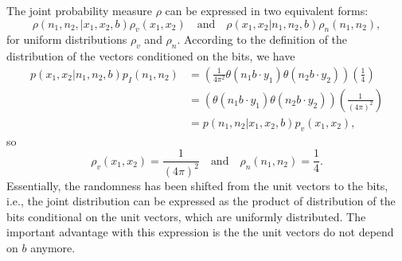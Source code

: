\documentclass[12pt,draft]{article}
\DeclareMathOperator{\R}{\mathbf{R}}
\theoremstyle{definition}
\theoremstyle{plain}
\begin{document}
    {
        \color{red}
        The joint probability measure $\rho$ can be
        expressed in two equivalent forms:
        \begin{equation}
            \rho(n_1,n_2,|x_1,x_2,b)\rho_v(x_1,x_2)
            \quad\text{and}\quad
            \rho(x_1,x_2|n_1,n_2,b)\rho_n(n_1,n_2),
        \end{equation}
        for uniform distributions $\rho_v$ and $\rho_n$.
        According to the definition of the distribution of
        the vectors conditioned on the bits, we have
        \begin{align}
            p(x_1,x_2|n_1,n_2,b) p_I(n_1,n_2)
            &= \left(
                \frac{1}{4\pi^2} 
            \theta(n_1 b \cdot y_1)\theta(n_2 b \cdot y_2) 
            \right) \left( \frac{1}{4} \right) \\
            &= \left( \theta(n_1 b \cdot y_1)\theta(n_2 b \cdot
            y_2)\right) \left( 
                \frac{1}{(4\pi)^2}
            \right) \\
            &= p(n_1,n_2|x_1,x_2,b) p_v(x_1,x_2),
        \end{align}
        so
        \begin{equation}
            \rho_v(x_1,x_2)
            = \frac{1}{(4\pi)^2}
            \quad\text{and}\quad
            \rho_n(n_1,n_2)
            = \frac{1}{4}.
        \end{equation}
        Essentially, the randomness has been shifted from
        the unit vectors to the bits, i.e., the joint
        distribution can be expressed as the product of
        distribution of the bits conditional on the unit
        vectors, which are uniformly distributed. The
        important advantage with this expression is the the
        unit vectors do not depend on $b$ anymore. 

    }
\end{document}
